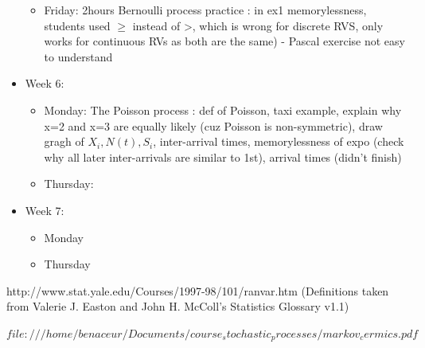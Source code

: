 \documentclass[12pt,a4paper]{article}
\begin{document}
\begin{itemize}
  	\begin{itemize}
  	\item Friday: 2hours Bernoulli process practice : in ex1 memorylessness, students used $\geq$ instead of >, which is wrong for discrete RVS, only works for continuous RVs as both are the same) - Pascal exercise not easy to understand
  	\end{itemize}
  	\item Week 6: 
  	\begin{itemize}
  	\item Monday: The Poisson process : def of Poisson, taxi example, explain why x=2 and x=3 are equally likely (cuz Poisson is non-symmetric), draw gragh of $X_i, N(t), S_i$, inter-arrival times, memorylessness of expo (check why all later inter-arrivals are similar to 1st), arrival times (didn't finish)
  	\item Thursday: 
  	\end{itemize}
  	\item Week 7: 
  	\begin{itemize}
  	\item Monday
  	\item Thursday
  	\end{itemize}
  	
  	
  \end{itemize}
  
  
  
  
  
  http://www.stat.yale.edu/Courses/1997-98/101/ranvar.htm
  (Definitions taken from Valerie J. Easton and John H. McColl's Statistics Glossary v1.1) 
  
  
  $file:///home/benaceur/Documents/course_stochastic_processes/markov_cermics.pdf$
  
\end{document}
